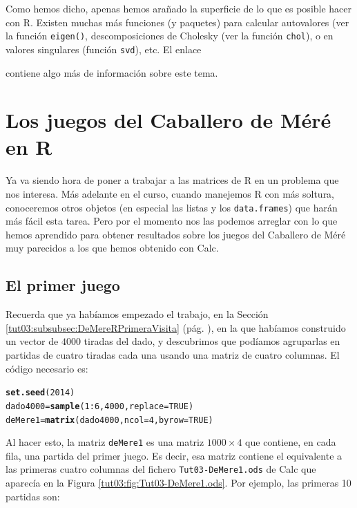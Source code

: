 \documentclass[10pt,a4paper]{article}\usepackage[]{graphicx}\usepackage[]{color}
\makeatletter
\newcommand{\hlnum}[1]{\textcolor[rgb]{0.686,0.059,0.569}{#1}}%
\newcommand{\hlopt}[1]{\textcolor[rgb]{0,0,0}{#1}}%
\newcommand{\hlstd}[1]{\textcolor[rgb]{0.345,0.345,0.345}{#1}}%
\newcommand{\hlkwb}[1]{\textcolor[rgb]{0.69,0.353,0.396}{#1}}%
\newcommand{\hlkwc}[1]{\textcolor[rgb]{0.333,0.667,0.333}{#1}}%
\newcommand{\hlkwd}[1]{\textcolor[rgb]{0.737,0.353,0.396}{\textbf{#1}}}%
\newenvironment{kframe}{%
 \def\at@end@of@kframe{}%
 \ifinner\ifhmode%
  \def\at@end@of@kframe{\end{minipage}}%
  \begin{minipage}{\columnwidth}%
 \fi\fi%
 \def\FrameCommand##1{\hskip\@totalleftmargin \hskip-\fboxsep
 \colorbox{shadecolor}{##1}\hskip-\fboxsep
     \hskip-\linewidth \hskip-\@totalleftmargin \hskip\columnwidth}%
 \MakeFramed {\advance\hsize-\width
   \@totalleftmargin\z@ \linewidth\hsize
   \@setminipage}}%
 {\par\unskip\endMakeFramed%
 \at@end@of@kframe}
\newenvironment{knitrout}{}{} %
\newcounter {cont01}
\makeatother
\begin{document}
Como hemos dicho, apenas hemos arañado la superficie de lo que es posible hacer con R. Existen muchas más funciones (y paquetes) para calcular autovalores (ver la función {\tt eigen()}, descomposiciones de Cholesky (ver la función {\tt chol}), o en valores singulares  (función {\tt svd}), etc. El enlace
\begin{center}
\end{center}
contiene algo más de información sobre este tema.

\section{Los juegos del Caballero de Méré en R}
\label{tut03:sec:JuegosCaballeroMereR}

Ya va siendo hora de poner a trabajar a las matrices de R en un problema que nos interesa. Más adelante en el curso, cuando  manejemos R con más soltura, conoceremos otros objetos (en especial las listas y los {\tt data.frames}) que harán más fácil esta tarea. Pero por el momento nos las podemos arreglar con lo que hemos aprendido para obtener resultados sobre los juegos del Caballero de Méré muy parecidos a los que hemos obtenido con Calc.

\subsection{El primer juego}
\label{tut03:subsec:PrimerJuego}


Recuerda que ya habíamos empezado el trabajo, en la Sección \ref{tut03:subsubsec:DeMereRPrimeraVisita} (pág. \pageref{tut03:subsubsec:DeMereRPrimeraVisita}), en la que habíamos construido un vector de $4000$ tiradas del dado, y descubrimos que podíamos agruparlas en partidas de cuatro tiradas cada una usando una matriz de cuatro columnas. El código necesario es:

\begin{knitrout}
\color{fgcolor}\begin{kframe}
\begin{alltt}
\hlkwd{set.seed}\hlstd{(}\hlnum{2014}\hlstd{)}
\hlstd{dado4000} \hlkwb{=} \hlkwd{sample}\hlstd{(}\hlnum{1}\hlopt{:}\hlnum{6}\hlstd{,} \hlnum{4000}\hlstd{,} \hlkwc{replace}\hlstd{=}\hlnum{TRUE}\hlstd{)}
\hlstd{deMere1} \hlkwb{=} \hlkwd{matrix}\hlstd{(dado4000,} \hlkwc{ncol}\hlstd{=}\hlnum{4}\hlstd{,} \hlkwc{byrow}\hlstd{=}\hlnum{TRUE}\hlstd{)}
\end{alltt}
\end{kframe}
\end{knitrout}
Al hacer esto, la matriz {\tt deMere1} es una matriz $1000\times 4$ que contiene, en cada fila, una partida del primer juego. Es decir, esa matriz contiene el equivalente a las primeras cuatro columnas del fichero {\tt Tut03-DeMere1.ods} de Calc que aparecía en la Figura \ref{tut03:fig:Tut03-DeMere1.ods}. Por ejemplo,  las primeras 10 partidas son:
\end{document}
